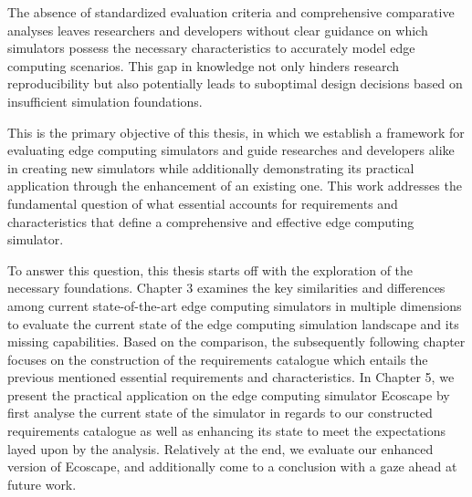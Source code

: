 The absence of standardized evaluation criteria and comprehensive comparative analyses leaves researchers and developers without clear guidance on which simulators possess the necessary 
characteristics to accurately model edge computing scenarios. 
This gap in knowledge not only hinders research reproducibility but also potentially leads to suboptimal design decisions based on insufficient simulation foundations.

This is the primary objective of this thesis, in which we establish a framework for evaluating edge computing simulators and guide researches and developers alike in creating new simulators while additionally 
demonstrating its practical application through the enhancement of an existing one.
This work addresses the fundamental question of what essential accounts for requirements and characteristics that define a comprehensive and effective edge computing simulator.

To answer this question, this thesis starts off with the exploration of the necessary foundations.
Chapter 3 examines the key similarities and differences among current state-of-the-art edge computing simulators in multiple dimensions to evaluate the current state of the edge computing simulation landscape and its missing 
capabilities.
Based on the comparison, the subsequently following chapter focuses on the construction of the requirements catalogue which entails the previous mentioned essential requirements and characteristics.
In Chapter 5, we present the practical application on the edge computing simulator Ecoscape by first analyse the current state of the simulator in regards to our constructed requirements catalogue as well as 
enhancing its state to meet the expectations layed upon by the analysis.
Relatively at the end, we evaluate our enhanced version of Ecoscape, and additionally come to a conclusion with a gaze ahead at future work.
